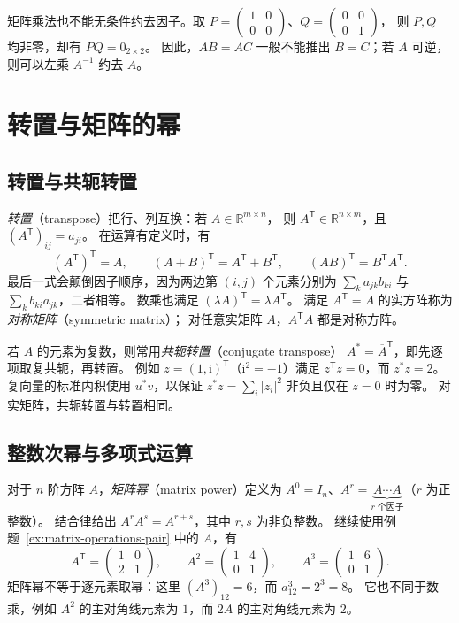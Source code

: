 \documentclass[UTF8,12pt,a4paper,fontset=fandol]{ctexart}
\begin{document}
矩阵乘法也不能无条件约去因子。取
$P=\begin{pmatrix}1&0\\0&0\end{pmatrix}$、$Q=\begin{pmatrix}0&0\\0&1\end{pmatrix}$，
则 $P,Q$ 均非零，却有 $PQ=0_{2\times2}$。
因此，$AB=AC$ 一般不能推出 $B=C$；若 $A$ 可逆，则可以左乘 $A^{-1}$ 约去 $A$。

\section{转置与矩阵的幂}

\subsection{转置与共轭转置}

\emph{转置}（transpose）把行、列互换：若 $A\in\mathbb R^{m\times n}$，
则 $A^{\mathsf T}\in\mathbb R^{n\times m}$，且 $(A^{\mathsf T})_{ij}=a_{ji}$。
在运算有定义时，有
\[
  (A^{\mathsf T})^{\mathsf T}=A,\qquad
  (A+B)^{\mathsf T}=A^{\mathsf T}+B^{\mathsf T},\qquad
  (AB)^{\mathsf T}=B^{\mathsf T}A^{\mathsf T}.
\]
最后一式会颠倒因子顺序，因为两边第 $(i,j)$ 个元素分别为
$\sum_k a_{jk}b_{ki}$ 与 $\sum_k b_{ki}a_{jk}$，二者相等。
数乘也满足 $(\lambda A)^{\mathsf T}=\lambda A^{\mathsf T}$。
满足 $A^{\mathsf T}=A$ 的实方阵称为\emph{对称矩阵}（symmetric matrix）；
对任意实矩阵 $A$，$A^{\mathsf T}A$ 都是对称方阵。

若 $A$ 的元素为复数，则常用\emph{共轭转置}（conjugate transpose）
$A^*=\overline{A}^{\mathsf T}$，即先逐项取复共轭，再转置。
例如 $z=(1,\mathrm i)^{\mathsf T}$（$\mathrm i^2=-1$）满足
$z^{\mathsf T}z=0$，而 $z^*z=2$。
复向量的标准内积使用 $u^*v$，以保证 $z^*z=\sum_i|z_i|^2$ 非负且仅在 $z=0$ 时为零。
对实矩阵，共轭转置与转置相同。

\subsection{整数次幂与多项式运算}

对于 $n$ 阶方阵 $A$，\emph{矩阵幂}（matrix power）定义为
$A^0=I_n$、$A^r=\underbrace{A\cdots A}_{r\text{ 个因子}}$（$r$ 为正整数）。
结合律给出 $A^rA^s=A^{r+s}$，其中 $r,s$ 为非负整数。
继续使用例题~\ref{ex:matrix-operations-pair} 中的 $A$，有
\[
  A^{\mathsf T}=\begin{pmatrix}1&0\\2&1\end{pmatrix},\qquad
  A^2=\begin{pmatrix}1&4\\0&1\end{pmatrix},\qquad
  A^3=\begin{pmatrix}1&6\\0&1\end{pmatrix}.
\]
矩阵幂不等于逐元素取幂：这里 $(A^3)_{12}=6$，而 $a_{12}^3=2^3=8$。
它也不同于数乘，例如 $A^2$ 的主对角线元素为 $1$，而 $2A$ 的主对角线元素为 $2$。
\end{document}
